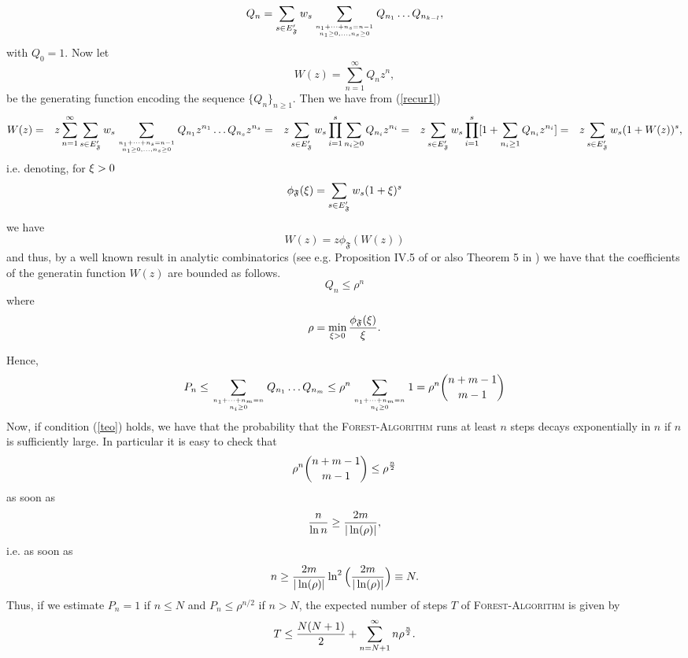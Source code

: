 \documentclass[11pt]{article}
\let\r=\rho \let\s=\sigma \let\t=\tau \let\th=\vartheta
\let\\=\noindent
\def\ee{\end{equation}}
\def\be{\begin{equation}}
\let\r=\rho \let\s=\sigma \let\t=\tau \let\th=\vartheta
\let\\=\noindent
\def\ee{\end{equation}}
\def\be{\begin{equation}}
\def\EA{{E_{\cal A}}}
\def\FF{{\mathfrak{F}}}
\begin{document}
\be\label{recur1}
Q_n=\sum_{s\in E'_{\FF}}w_s\sum_{n_{1}+\dots +n_{s}=n-1\atop n_1\ge 0, \dots ,n_{s}\ge 0}
Q_{n_1}\dots Q_{n_{k-l}},
\ee
with $Q_0=1$.
Now let
$$
W(z)=\sum_{n=1}^\infty Q_n z^n,
$$
be the generating function encoding the sequence $\{Q_n\}_{n\ge 1}$. Then
we have  from (\ref{recur1})
\begin{eqnarray}
  W(z) &=&  z\sum_{n=1}^{\infty}  \sum_{s\in E'_{\FF}}w_s\sum_{n_{1}+\dots +n_{s}=n-1\atop n_1\ge 0, \dots ,n_{s}\ge 0}
Q_{n_1}z^{n_1}\dots Q_{n_{s}}z^{n_{s}}  \\
       &=&  z \sum_{s\in E'_{\FF}}w_s\prod_{i=1}^s\sum_{n_i\ge 0}Q_{n_i}z^{n_i} \\
       &=& z \sum_{s\in E'_{\FF}}w_s\prod_{i=1}^s[1+ \sum_{n_i\ge 1}Q_{n_i}z^{n_i}] \\
       &=& z  \sum_{s\in E'_{\FF}}w_s(1+W(z))^s,
\end{eqnarray}
i.e. denoting, for $\xi>0$
\begin{equation}
\phi_{\FF}(\x)=\sum_{s\in E'_\FF}w_s(1+\x)^s %
\end{equation}
we have
\begin{equation}
W(z)= z \phi_\FF(W(z))
\end{equation}
and thus, by a well known result in analytic combinatorics (see e.g. Proposition IV.5 of \cite{FS} or also Theorem 5 in  \cite{Dm}) we have that
the coefficients of the generatin function $W(z)$ are bounded as follows.
\begin{equation}
Q_n\le \r^n
\end{equation}
where
\begin{equation}
\r=\min_{\x>0}{\phi_\FF(\x)\over \x}.
\end{equation}

\\Hence,
\begin{equation}
P_n\le \sum_{n_1+\dots +n_m=n\atop n_i\ge 0}Q_{n_1}\dots Q_{n_m}\le \r^n  \sum_{n_1+\dots +n_m=n\atop n_i\ge 0}1=\r^n {n+m-1\choose m-1}
\end{equation}
Now,  if condition (\ref{teo}) holds, we have that the probability that the \textsc{Forest-Algorithm} runs at least  $n$ steps decays exponentially in $n$ if $n$ is sufficiently large.  In particular it is easy to check that
$$
\r^n {n+m-1\choose m-1}\le \r^{n\over 2}
$$
as soon as
$$
{n\over \ln n}\ge {2m\over |\ln(\r)|},
$$
i.e.
as soon as
$$
n\ge {2m\over |\ln(\r)|}\ln^2\Big({2m\over |\ln(\r)|}\Big) \equiv N.
$$
Thus, if we estimate $P_n=1$ if $n\le N$ and $P_n\le \r^{n/2}$ if $n>N$, the expected number of steps $T$ of \textsc{Forest-Algorithm} is given by
$$
T\le {N(N+1)\over 2}+ \sum_{n=N+1}^\infty n\r^{n\over 2}.
$$
\end{document}
